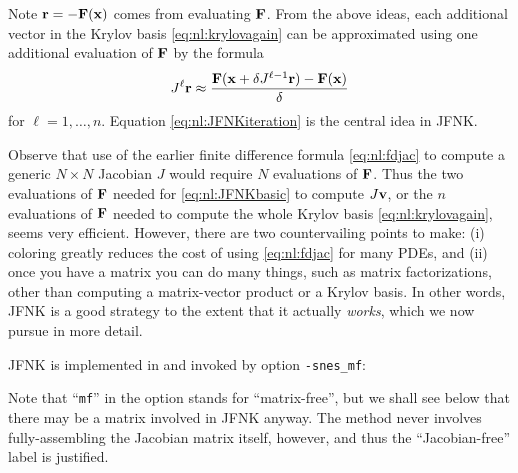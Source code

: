 Note $\mathbf{r} = - \mathbf{F}(\mathbf{x})$ comes from evaluating $\mathbf{F}$.  From the above ideas, each additional vector in the Krylov basis \eqref{eq:nl:krylovagain} can be approximated using one additional evaluation of $\mathbf{F}$ by the formula
\begin{equation}
J^{\ell} \mathbf{r} \approx \frac{\mathbf{F}(\mathbf{x}+\delta J^{\ell-1}\mathbf{r}) - \mathbf{F}(\mathbf{x})}{\delta} \label{eq:nl:JFNKiteration}
\end{equation}
for $\ell=1,\dots,n$.  Equation \eqref{eq:nl:JFNKiteration} is the central idea in JFNK.

Observe that use of the earlier finite difference formula \eqref{eq:nl:fdjac} to compute a generic $N\times N$ Jacobian $J$ would require $N$ evaluations of $\mathbf{F}$.  Thus the two evaluations of $\mathbf{F}$ needed for \eqref{eq:nl:JFNKbasic} to compute $J\mathbf{v}$, or the $n$ evaluations of $\mathbf{F}$ needed to compute the whole Krylov basis \eqref{eq:nl:krylovagain}, seems very efficient.  However, there are two countervailing points to make: (i) coloring greatly reduces the cost of using \eqref{eq:nl:fdjac} for many PDEs, and (ii) once you have a matrix you can do many things, such as matrix factorizations, other than computing a matrix-vector product or a Krylov basis.  In other words, JFNK is a good strategy to the extent that it actually \emph{works}, which we now pursue in more detail.

JFNK is implemented in \PETSc and invoked by option \texttt{-snes\_mf}:
Note that ``\texttt{mf}'' in the option stands for ``matrix-free'', but we shall see below that there may be a matrix involved in JFNK anyway.  The method never involves fully-assembling the Jacobian matrix itself, however, and thus the ``Jacobian-free'' label is justified.

